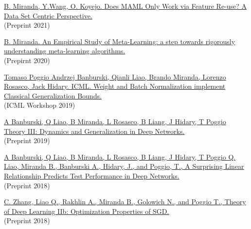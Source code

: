 \documentclass{article}
\newenvironment{changemargin}[2]{%
  \begin{list}{}{%
    \setlength{\topsep}{0pt}%
    \setlength{\leftmargin}{#1}%
    \setlength{\rightmargin}{#2}%
    \setlength{\listparindent}{\parindent}%
    \setlength{\itemindent}{\parindent}%
    \setlength{\parsep}{\parskip}%
  }%
  \item[]}{\end{list}
}
\newenvironment{body} {
	\vspace*{-16pt}
	\begin{changemargin}{-0.25in}{-0.5in}
  }	
	{\end{changemargin}
}
\begin{document}
\begin{body}
    \vspace{10pt}
    \href{https://arxiv.org/abs/2112.13137}{B. Miranda, Y.Wang, O. Koyejo.
    Does MAML Only Work via Feature Re-use? A Data Set Centric Perspective.} 
    \\
    (Preprint 2021)
    
    
    \vspace{10pt}
    \href{https://www.ideals.illinois.edu/handle/2142/109139}{B. Miranda.
    An Empirical Study of Meta-Learning: a step towards rigorously understanding meta-learning algorithms.}
    \\
    (Prepirnt 2020)
    
    \vspace{10pt}
    \href{https://drive.google.com/file/d/1G2IVmbENphwB3lxROEpCHQjsClKqRtKP/view}{Tomaso Poggio Andrzej Banburski, Qianli Liao, Brando Miranda, Lorenzo Rosasco, Jack Hidary. ICML. 
    Weight and Batch Normalization implement Classical Generalization Bounds.}
    \\
    (ICML Workshop 2019)
    
    \vspace{10pt}
    \href{https://arxiv.org/abs/1903.04991}{A Banburski, Q Liao, B Miranda, L Rosasco, B Liang, J Hidary, T Poggio
    Theory III: Dynamics and Generalization in Deep Networks.}
    \\
    (Preprint 2019)
    
    \vspace{10pt}
    \href{https://arxiv.org/abs/1807.09659}{A Banburski, Q Liao, B Miranda, L Rosasco, B Liang, J Hidary, T Poggio
    Q. Liao, Miranda B., Banburski A., Hidary, J., and Poggio, T., A Surprising Linear Relationship Predicts Test Performance in Deep Networks.}
    \\
    (Preprint 2018)
    
    
    \vspace{10pt}
    \href{https://arxiv.org/abs/1801.02254}{C. Zhang, Liao Q., Rakhlin A., Miranda B., Golowich N., and Poggio T., Theory of Deep Learning IIb: Optimization Properties of SGD.}
    \\
    (Preprint 2018)
    

\end{body}
\end{document}
